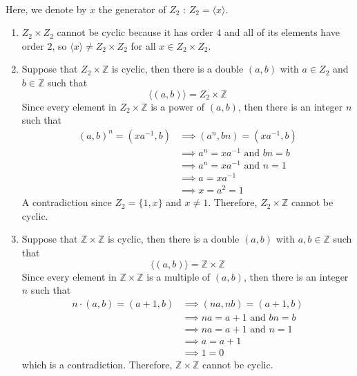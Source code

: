 \begin{solution}
    \\ Here, we denote by $x$ the generator of $Z_2$ : $Z_2=
    \langle x\rangle$.
    \begin{enumerate}[label=(\alph*)]
        \item $Z_2\times Z_2$ cannot be cyclic because it has order $4$ and
        all of its elements have order $2$, so $\langle x\rangle\neq
        Z_2\times Z_2$ for all $x\in Z_2\times Z_2$.

        \item Suppose that $Z_2\times \mathbb{Z}$ is cyclic, then there is
        a double $(a,b)$ with $a\in Z_2$ and $b\in\mathbb{Z}$ such that
        $$\langle (a,b) \rangle = Z_2\times \mathbb{Z}$$
        Since every element in $Z_2\times \mathbb{Z}$ is a power of $(a,b)$,
        then there is an integer $n$ such that
        \begin{align*}
            (a,b)^n=(xa^{-1},b) &\implies (a^n, bn) = (xa^{-1},b) \\
            &\implies a^n=xa^{-1} \text{ and } bn=b \\
            &\implies a^n=xa^{-1} \text{ and } n=1 \\
            &\implies a=xa^{-1} \\
            &\implies x=a^2=1
        \end{align*}
        A contradiction since $Z_2=\{1,x\}$ and $x\neq 1$. Therefore,
        $Z_2\times \mathbb{Z}$ cannot be cyclic.

        \item Suppose that $\mathbb{Z}\times \mathbb{Z}$ is cyclic, then 
        there is a double $(a,b)$ with $a, b\in\mathbb{Z}$ such that
        $$\langle (a,b) \rangle = \mathbb{Z}\times \mathbb{Z}$$
        Since every element in $\mathbb{Z}\times \mathbb{Z}$ is a multiple
        of $(a,b)$, then there is an integer $n$ such that
        \begin{align*}
            n\cdot(a,b)=(a+1,b) &\implies (na, nb) = (a+1,b) \\
            &\implies na=a+1 \text{ and } bn=b \\
            &\implies na = a+1 \text{ and } n=1 \\
            &\implies a=a+1 \\
            &\implies 1=0
        \end{align*}
        which is a contradiction. Therefore, $\mathbb{Z}\times \mathbb{Z}$
        cannot be cyclic.
    \end{enumerate}
\end{solution}

